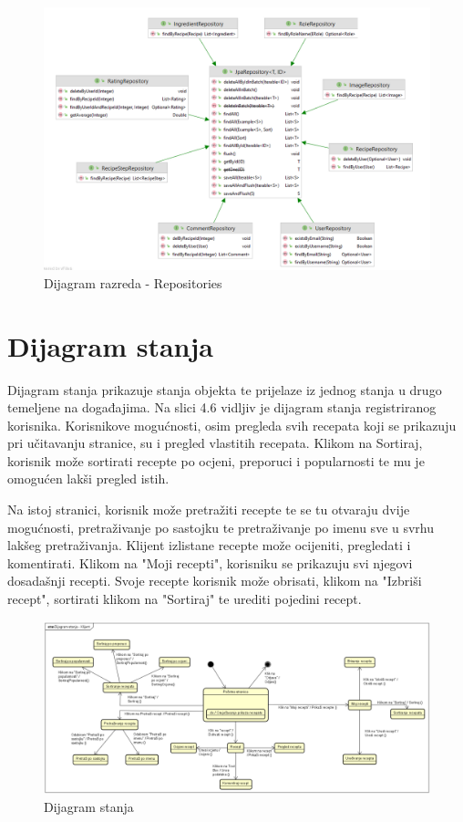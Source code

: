 \begin{figure}[H]
	\includegraphics[scale=0.6]{slike/repositoriesDiagram.PNG} %
	\centering
	\caption{Dijagram razreda - Repositories}
	\label{fig:promjene}
\end{figure}


\eject

\section{Dijagram stanja}

Dijagram stanja prikazuje stanja objekta te prijelaze iz jednog stanja u drugo temeljene na događajima. Na slici 4.6 vidljiv je dijagram stanja registriranog korisnika. Korisnikove mogućnosti, osim pregleda svih recepata koji se prikazuju pri učitavanju stranice, su i pregled vlastitih recepata. Klikom na Sortiraj, korisnik može sortirati recepte po ocjeni, preporuci i popularnosti te mu je omogućen lakši pregled istih. 

Na istoj stranici, korisnik može pretražiti recepte te se tu otvaraju dvije mogućnosti, pretraživanje po sastojku te pretraživanje po imenu sve u svrhu lakšeg pretraživanja. Klijent izlistane recepte može ocijeniti, pregledati i komentirati. 
Klikom na "Moji recepti", korisniku se prikazuju svi njegovi dosadašnji recepti. Svoje recepte korisnik može obrisati, klikom na "Izbriši recept", sortirati klikom na "Sortiraj" te urediti pojedini recept.

\begin{figure}[H]
	\includegraphics[scale=0.5]{slike/StateD2.PNG} %
	\centering
	\caption{Dijagram stanja}
	\label{fig:promjene}
\end{figure}

